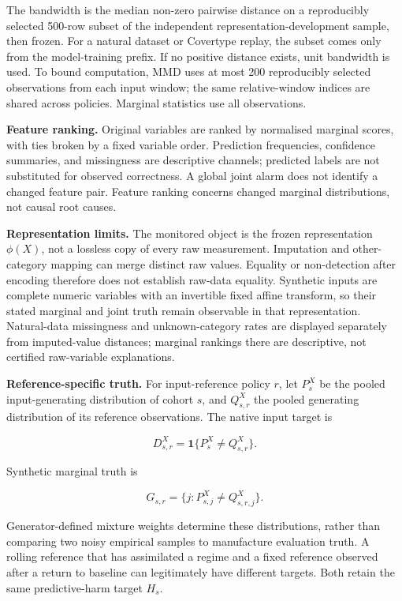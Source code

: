 \documentclass[
]{article}
\begin{document}
The bandwidth is the median non-zero pairwise distance on a reproducibly
selected 500-row subset of the independent representation-development
sample, then frozen. For a natural dataset or Covertype replay, the
subset comes only from the model-training prefix. If no positive
distance exists, unit bandwidth is used. To bound computation, MMD uses
at most 200 reproducibly selected observations from each input window;
the same relative-window indices are shared across policies. Marginal
statistics use all observations.

\textbf{Feature ranking.} Original variables are ranked by normalised
marginal scores, with ties broken by a fixed variable order. Prediction
frequencies, confidence summaries, and missingness are descriptive
channels; predicted labels are not substituted for observed correctness.
A global joint alarm does not identify a changed feature pair. Feature
ranking concerns changed marginal distributions, not causal root causes.

\textbf{Representation limits.} The monitored object is the frozen
representation \(\phi(X)\), not a lossless copy of every raw
measurement. Imputation and other-category mapping can merge distinct
raw values. Equality or non-detection after encoding therefore does not
establish raw-data equality. Synthetic inputs are complete numeric
variables with an invertible fixed affine transform, so their stated
marginal and joint truth remain observable in that representation.
Natural-data missingness and unknown-category rates are displayed
separately from imputed-value distances; marginal rankings there are
descriptive, not certified raw-variable explanations.

\textbf{Reference-specific truth.} For input-reference policy \(r\), let
\(P_s^X\) be the pooled input-generating distribution of cohort \(s\),
and \(Q_{s,r}^X\) the pooled generating distribution of its reference
observations. The native input target is

\[
D_{s,r}^X=\mathbf{1}\{P_s^X\ne Q_{s,r}^X\}.
\]

Synthetic marginal truth is

\[
G_{s,r}=\{j:P_{s,j}^X\ne Q_{s,r,j}^X\}.
\]

Generator-defined mixture weights determine these distributions, rather
than comparing two noisy empirical samples to manufacture evaluation
truth. A rolling reference that has assimilated a regime and a fixed
reference observed after a return to baseline can legitimately have
different targets. Both retain the same predictive-harm target \(H_s\).
\end{document}
